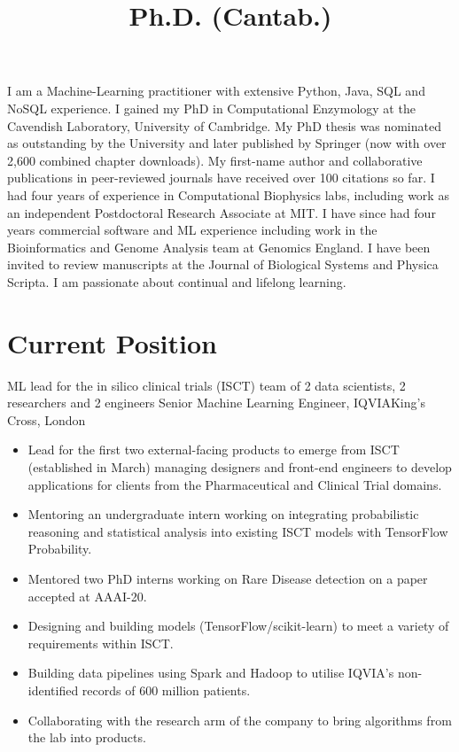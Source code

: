 \documentclass[11pt,a4paper,sans]{moderncv}        %
\title{Ph.D. (Cantab.)}                               %
\begin{document}
\makecvtitle
\vspace*{-1.0cm}
%
I am a Machine-Learning practitioner with extensive Python, Java, SQL and NoSQL experience. 
%
I gained my PhD in Computational Enzymology at the Cavendish Laboratory, University of Cambridge. 
%
My PhD thesis was nominated as outstanding by the University and later published by Springer (now with over 2,600 combined chapter downloads).
%
My first-name author and collaborative publications in peer-reviewed journals have received over 100 citations so far. 
%
I had four years of experience in Computational Biophysics labs, including work as an independent Postdoctoral Research Associate at MIT. 
%
I have since had four years commercial software and ML experience including work in the Bioinformatics and Genome Analysis team at Genomics England. 
%
I have been invited to review manuscripts at the Journal of Biological Systems and Physica Scripta. 
%
I am passionate about continual and lifelong learning.


\vspace*{-0.4cm}
\section{Current Position}
\vspace*{-0.15cm}
{\small{ML lead for the in silico clinical trials (ISCT) team of 2 data scientists, 2 researchers and 2 engineers}}
{Senior Machine Learning Engineer, IQVIA}{King's Cross, London}{}
{
\begin{itemize}%
\item Lead for the first two external-facing products to emerge from ISCT (established in March)
managing designers and front-end engineers to develop applications for clients
from the Pharmaceutical and Clinical Trial domains.
\item Mentoring an undergraduate intern working on integrating 
probabilistic reasoning and statistical analysis into 
existing ISCT models with TensorFlow Probability.
\item Mentored two PhD interns working on Rare Disease detection on a paper accepted at AAAI-20.
\item Designing and building models (TensorFlow/scikit-learn)
to meet a variety of requirements within ISCT.
\item Building data pipelines using Spark and Hadoop to utilise 
IQVIA's non-identified records of 600 million patients.
\item Collaborating with the research arm of the company to bring 
algorithms from the lab into products.
\end{itemize}}
\vspace*{-0.4cm}
\end{document}
